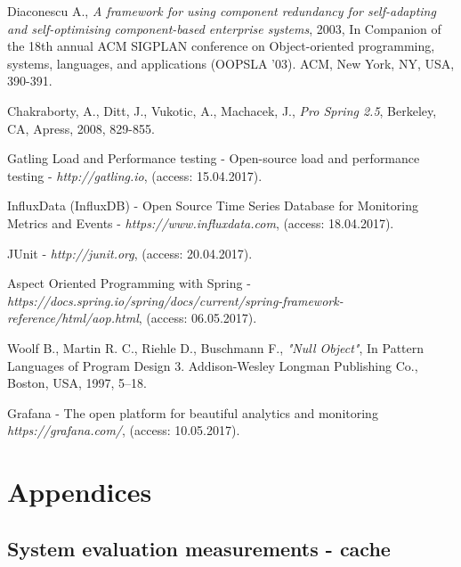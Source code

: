 \documentclass[10pt,a4paper]{article}
\begin{document}
\begin{thebibliography}{9}
Diaconescu A., \textit{A framework for using component redundancy for self-adapting and self-optimising component-based enterprise systems}, 2003, In Companion of the 18th annual ACM SIGPLAN conference on Object-oriented programming, systems, languages, and applications (OOPSLA '03). ACM, New York, NY, USA, 390-391. 

Chakraborty, A., Ditt, J., Vukotic, A., Machacek, J., \textit{Pro Spring 2.5}, Berkeley, CA, Apress, 2008, 829-855.  

Gatling Load and Performance testing - Open-source load and performance testing - \textit{http://gatling.io}, (access: 15.04.2017).

InfluxData (InfluxDB) - Open Source Time Series Database for Monitoring Metrics and Events - \textit{https://www.influxdata.com}, (access: 18.04.2017).


JUnit - \textit{http://junit.org}, (access: 20.04.2017).

Aspect Oriented Programming with Spring - \\
\textit{https://docs.spring.io/spring/docs/current/spring-framework-reference/html/aop.html}, (access: 06.05.2017).

Woolf B., Martin R. C., Riehle D., Buschmann F., \textit{"Null Object"}, In Pattern Languages of Program Design 3. Addison-Wesley Longman Publishing Co., Boston, USA, 1997, 5–18. 

Grafana - The open platform for beautiful analytics and monitoring \textit{https://grafana.com/}, (access: 10.05.2017).

\end{thebibliography}

\pagebreak
\clearpage
\section{Appendices}

\appendix
\setcounter{table}{0}
\renewcommand{\thesubsection}{\Alph{subsection}}
\renewcommand{\thetable}{\Alph{subsection}.\numberwithin{table}{subsection}}

\subsection{System evaluation measurements - cache} \label{appendixcacheeval}
\end{document}
